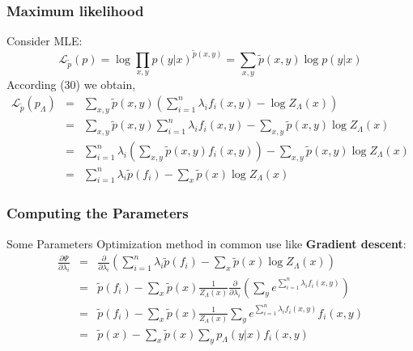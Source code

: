 \documentclass[slidestop,compress,mathserif]{beamer}
\begin{document}
	\begin{frame}[shrink]
		\frametitle{Maximum likelihood}
		Consider MLE:
		\begin{equation}
			\mathcal{L}_{\widetilde{p}}(p) = \log \prod_{x,y} p(y|x)^{\widetilde{p}(x,y)} = \sum_{x,y}\widetilde{p}(x,y)\log p(y|x)
		\end{equation}
		According (30) we obtain,
		\begin{eqnarray*}
			\mathcal{L}_{\widetilde{p}}(p_\Lambda) &=& \sum_{x,y}\widetilde{p}(x,y)\left(\sum_{i=1}^{n} \lambda_if_i(x,y) - \log Z_\Lambda(x) \right)\\
			&=& \sum_{x,y}\widetilde{p}(x,y)\sum_{i=1}^{n}\lambda_if_i(x,y)-\sum_{x,y}\widetilde{p}(x,y)\log Z_\Lambda(x) \\
			&=& \sum_{i=1}^{n}\lambda_i\left(\sum_{x,y}\widetilde{p}(x,y)f_i(x,y)\right) - \sum_{x,y}\widetilde{p}(x,y)\log Z_\Lambda(x)\\
			&=& \sum_{i=1}^{n}\lambda_i\widetilde{p}(f_i) - \sum_x\widetilde{p}(x)\log Z_\Lambda(x)
		\end{eqnarray*}
	\end{frame}
	
	\begin{frame}
		\frametitle{Computing the Parameters}
		Some Parameters Optimization method in common use like\textbf{ Gradient descent}:
		\begin{eqnarray*}
			\frac{\partial\Psi}{\partial\lambda_i} &=& \frac{\partial}{\partial\lambda_i}\left(\sum_{i=1}^{n}\lambda_i\widetilde{p}(f_i) - \sum_x\widetilde{p}(x)\log Z_{\Lambda}(x) \right)\\
			&=& \widetilde{p}(f_i) - \sum_x\widetilde{p}(x)\frac{1}{Z_{\Lambda}(x)}\frac{\partial}{\partial\lambda_i}\left(\sum_y e^{\sum_{i=1}^{n}\lambda_if_i(x,y)} \right)\\
			&=& \widetilde{p}(f_i) - \sum_x\widetilde{p}(x)\frac{1}{Z_{\Lambda}(x)}\sum_y e^{\sum_{i=1}^{n}\lambda_if_i(x,y)}f_i(x,y)\\
			&=& \widetilde{p}(x) - \sum_x \widetilde{p}(x)\sum_y p_{\Lambda}(y|x)f_i(x,y)
		\end{eqnarray*}
	\end{frame}
	
\end{document}

